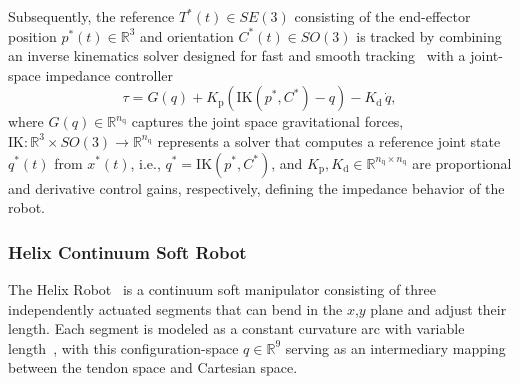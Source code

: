 Subsequently, the reference $T^*(t) \in SE(3)$ consisting of the end-effector position $p^*(t) \in \mathbb{R}^3$ and orientation $C^*(t) \in SO(3)$ is tracked by combining an inverse kinematics solver designed for fast and smooth tracking~\citep{wang2023rangedik} with a joint-space impedance controller
\begin{equation}
     \tau = G(q) + K_\mathrm{p} \left( \mathrm{IK}(p^*, C^*) - q \right) - K_\mathrm{d} \, \dot{q},
\end{equation}
where $G(q) \in \mathbb{R}^{n_\mathrm{q}}$ captures the joint space gravitational forces, $\mathrm{IK}: \mathbb{R}^3 \times SO(3) \to \mathbb{R}^{n_\mathrm{q}}$ represents a solver that computes a reference joint state $q^{*}(t)$ from $x^{*}(t)$, i.e., $q^{*} = \mathrm{IK}(p^*, C^*)$, and $K_\mathrm{p}, K_\mathrm{d} \in \mathbb{R}^{n_\mathrm{q} \times n_\mathrm{q}}$ are proportional and derivative control gains, respectively, defining the impedance behavior of the robot.

\subsubsection{Helix Continuum Soft Robot}
The Helix Robot~\citep{guan2023trimmed} is a continuum soft manipulator consisting of three independently actuated segments that can bend in the $x$,$y$ plane and adjust their length. Each segment is modeled as a constant curvature arc with variable length~\citep{guan2023trimmed, stella2023piecewise}, with this configuration-space $q \in \mathbb{R}^{9}$ serving as an intermediary mapping between the tendon space and Cartesian space.

